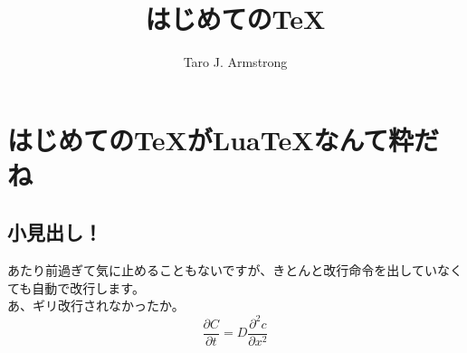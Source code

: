 \documentclass{ltjsarticle}
\begin{document}
\title{はじめての\TeX }
\author{Taro J. Armstrong}
\maketitle
\section{はじめての\TeX がLua\TeX なんて粋だね}

\subsection{小見出し！}
あたり前過ぎて気に止めることもないですが、きとんと改行命令を出していなくても自動で改行します。
\\あ、ギリ改行されなかったか。
\begin{equation}
  \frac{\partial C}{\partial t}=D\frac{\partial^2 c}{\partial x^2}
\end{equation}
\end{document}
